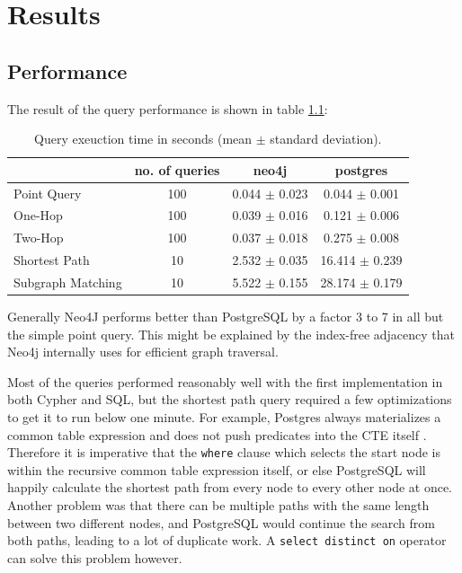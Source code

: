 \documentclass[11pt, a4paper,oneside,chapterprefix=false]{scrbook}
\begin{document}
\chapter{Results} \label{chp:results}

\section{Performance} \label{sec:performance}

The result of the query performance is shown in table \ref{table:performance}:

\begin{table}
	\begin{center}
		\begin{tabular}{ |l|c|c|c| }
			\hline
			& no. of queries & neo4j & postgres \\
			\hline
			Point Query & 100 & 0.044 $\pm$ 0.023 & 0.044 $\pm$ 0.001 \\
			One-Hop & 100 & 0.039 $\pm$ 0.016 & 0.121 $\pm$ 0.006 \\
			Two-Hop & 100 & 0.037 $\pm$ 0.018 & 0.275 $\pm$ 0.008 \\
			Shortest Path & 10 & 2.532 $\pm$ 0.035 & 16.414 $\pm$ 0.239 \\
			Subgraph Matching & 10 & 5.522 $\pm$ 0.155 & 28.174 $\pm$ 0.179 \\
			\hline
		\end{tabular}
		\caption{\label{table:performance} Query exeuction time in seconds (mean $\pm$ standard deviation).}
	\end{center}
\end{table}

Generally Neo4J performs better than PostgreSQL by a factor 3 to 7 in all but the simple point query.
This might be explained by the index-free adjacency that Neo4j internally uses for efficient graph traversal.

Most of the queries performed reasonably well with the first implementation in both Cypher and SQL, but the shortest path query required a few optimizations to get it to run below one minute. For example, Postgres always materializes a common table expression and does not push predicates into the CTE itself \cite{postgresMaterialize}.
Therefore it is imperative that the \lstinline{where} clause which selects the start node is within the recursive common table expression itself, or else PostgreSQL will happily calculate the shortest path from every node to every other node at once.
Another problem was that there can be multiple paths with the same length between two different nodes, and PostgreSQL would continue the search from both paths, leading to a lot of duplicate work. A \lstinline{select distinct on} operator can solve this problem however.
\end{document}
